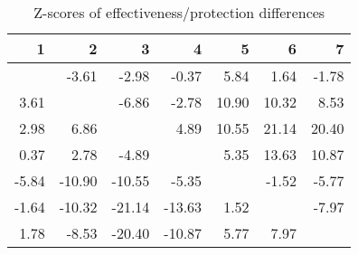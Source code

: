 \begin{table}[ht]
\centering
\begin{tabular}{rrrrrrr}
  \hline
1 & 2 & 3 & 4 & 5 & 6 & 7 \\ 
  \hline
 & -3.61 & -2.98 & -0.37 & 5.84 & 1.64 & -1.78 \\ 
  3.61 &  & -6.86 & -2.78 & 10.90 & 10.32 & 8.53 \\ 
  2.98 & 6.86 &  & 4.89 & 10.55 & 21.14 & 20.40 \\ 
  0.37 & 2.78 & -4.89 &  & 5.35 & 13.63 & 10.87 \\ 
  -5.84 & -10.90 & -10.55 & -5.35 &  & -1.52 & -5.77 \\ 
  -1.64 & -10.32 & -21.14 & -13.63 & 1.52 &  & -7.97 \\ 
  1.78 & -8.53 & -20.40 & -10.87 & 5.77 & 7.97 &  \\ 
   \hline
\end{tabular}
\caption{Z-scores of effectiveness/protection differences} 
\end{table}
